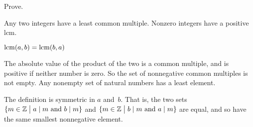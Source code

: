 \documentclass{ibl}
\begin{document}
\begin{ex} Prove.
\begin{exes}
\item {} Any two integers have a least common multiple.
  Nonzero integers have a positive lcm.
\item {} $\operatorname{lcm}(a,b)=\operatorname{lcm}(b,a)$
\end{exes}
\begin{ans}
\begin{exes}
\item The absolute value of the product of the two is a common multiple,
  and is positive if neither number is zero.
  So the set of nonnegative common multiples is not empty.
  Any nonempty set of natural numbers has a least element.
\item The definition is symmetric in $a$ and~$b$.
  That is, the two sets
  $\{m\in\mathbb{Z} \bigm| \text{$a\mid m$ and $b\mid m$}\}$
  and     
  $\{m\in\mathbb{Z} \bigm| \text{$b\mid m$ and $a\mid m$}\}$
  are equal, and so have the same smallest nonnegative element.
\end{exes}
\end{ans}
\end{ex}
\end{document}
